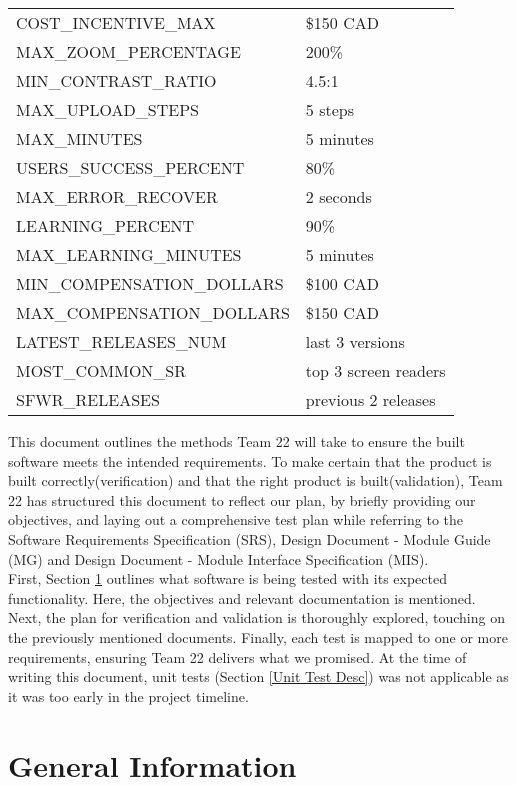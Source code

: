 \documentclass[12pt, titlepage]{article}
\begin{document}
\begin{longtable}{|p{8.0cm}|p{8.0cm}|}
  COST\_INCENTIVE\_MAX & \$150 CAD \\
  MAX\_ZOOM\_PERCENTAGE & 200\% \\
  MIN\_CONTRAST\_RATIO & 4.5:1\\
  MAX\_UPLOAD\_STEPS & 5 steps\\
  MAX\_MINUTES & 5 minutes\\
  USERS\_SUCCESS\_PERCENT & 80\%\\
  MAX\_ERROR\_RECOVER & 2 seconds \\
  LEARNING\_PERCENT & 90\% \\
  MAX\_LEARNING\_MINUTES & 5 minutes \\
  MIN\_COMPENSATION\_DOLLARS & \$100 CAD \\
  MAX\_COMPENSATION\_DOLLARS & \$150 CAD \\
  LATEST\_RELEASES\_NUM & last 3 versions \\
  MOST\_COMMON\_SR & top 3 screen readers \\
  SFWR\_RELEASES & previous 2 releases \\

  \bottomrule
\end{longtable}

\newpage


\noindent This document outlines the methods Team 22 will take to
ensure the built software meets the intended requirements. To make
certain that the product is built correctly(verification) and that
the right product is built(validation), Team 22 has structured this
document to reflect our plan, by briefly providing our objectives,
and laying out a comprehensive test plan while referring to the
Software Requirements Specification (SRS), Design Document - Module
Guide (MG) and Design Document - Module Interface Specification (MIS). \\

First, Section \ref{geninfo} outlines what software is being tested
with its expected functionality. Here, the objectives and relevant
documentation is mentioned. Next, the plan for verification and
validation is thoroughly explored, touching on the previously
mentioned documents. Finally, each test is mapped to one or more
requirements, ensuring Team 22 delivers what we promised. At the time
of writing this document, unit tests (Section \ref{Unit Test Desc})
was not applicable as it was too early in the project timeline.\\

\section{General Information} \label{geninfo}
\end{document}

